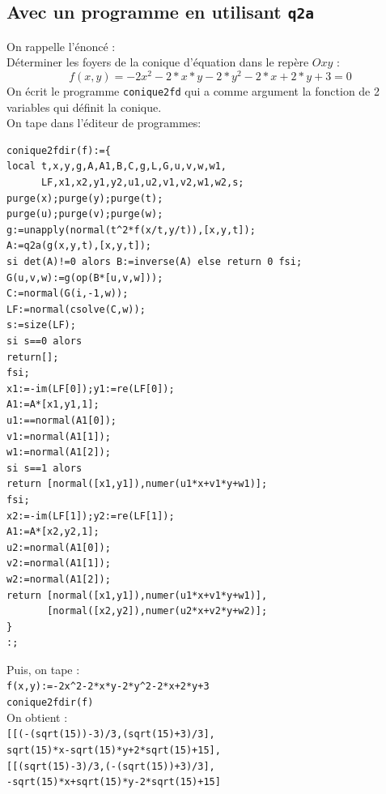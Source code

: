 \documentclass[a4paper,11pt]{book}
\begin{document}
\subsection{Avec un programme en utilisant {\tt q2a}}
On rappelle l'\'enonc\'e :\\
D\'eterminer les foyers de la conique d'\'equation dans le rep\`ere $Oxy$ :
$$f(x,y)=-2x^2-2*x*y-2*y^2-2*x+2*y+3=0$$
On \'ecrit le programme {\tt conique2fd} qui a comme argument la fonction de 2 variables qui d\'efinit la conique.\\
On tape dans l'\'editeur de programmes:
\begin{verbatim}
conique2fdir(f):={
local t,x,y,g,A,A1,B,C,g,L,G,u,v,w,w1,
      LF,x1,x2,y1,y2,u1,u2,v1,v2,w1,w2,s;
purge(x);purge(y);purge(t);
purge(u);purge(v);purge(w);
g:=unapply(normal(t^2*f(x/t,y/t)),[x,y,t]);
A:=q2a(g(x,y,t),[x,y,t]);
si det(A)!=0 alors B:=inverse(A) else return 0 fsi;
G(u,v,w):=g(op(B*[u,v,w]));
C:=normal(G(i,-1,w));
LF:=normal(csolve(C,w));
s:=size(LF);
si s==0 alors 
return[]; 
fsi;
x1:=-im(LF[0]);y1:=re(LF[0]);
A1:=A*[x1,y1,1];
u1:==normal(A1[0]);
v1:=normal(A1[1]);
w1:=normal(A1[2]);
si s==1 alors 
return [normal([x1,y1]),numer(u1*x+v1*y+w1)];
fsi;
x2:=-im(LF[1]);y2:=re(LF[1]);
A1:=A*[x2,y2,1];
u2:=normal(A1[0]);
v2:=normal(A1[1]);
w2:=normal(A1[2]);
return [normal([x1,y1]),numer(u1*x+v1*y+w1)],
       [normal([x2,y2]),numer(u2*x+v2*y+w2)];
}
:;
\end{verbatim}
Puis, on tape :\\
{\tt f(x,y):=-2x\verb|^|2-2*x*y-2*y\verb|^|2-2*x+2*y+3}\\
{\tt conique2fdir(f)}\\
On obtient :\\
{\tt [[(-(sqrt(15))-3)/3,(sqrt(15)+3)/3],\\sqrt(15)*x-sqrt(15)*y+2*sqrt(15)+15],}\\
{\tt [[(sqrt(15)-3)/3,(-(sqrt(15))+3)/3],\\-sqrt(15)*x+sqrt(15)*y-2*sqrt(15)+15]}
\end{document}
